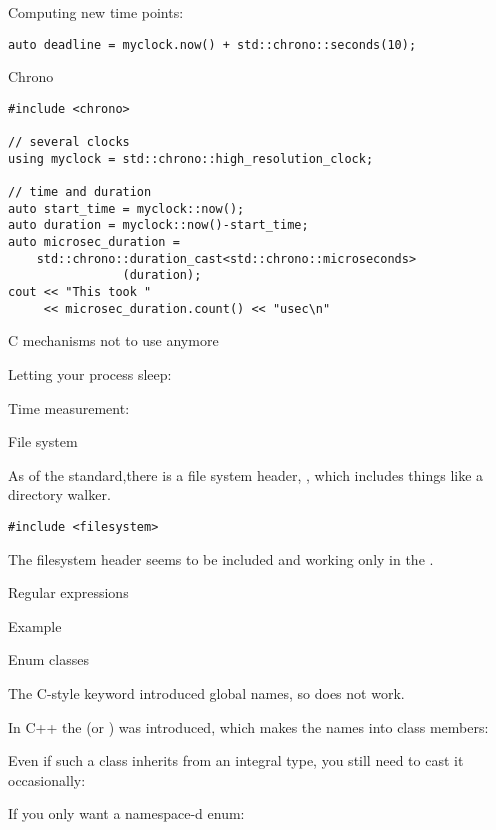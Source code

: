 Computing new time points:
\begin{lstlisting}
auto deadline = myclock.now() + std::chrono::seconds(10);
\end{lstlisting}

\begin{slide}{Chrono}
\label{sl:chrono}
\begin{lstlisting}
#include <chrono>

// several clocks
using myclock = std::chrono::high_resolution_clock;

// time and duration
auto start_time = myclock::now();
auto duration = myclock::now()-start_time;
auto microsec_duration =
    std::chrono::duration_cast<std::chrono::microseconds>
                (duration);
cout << "This took "
     << microsec_duration.count() << "usec\n"
\end{lstlisting}
\end{slide}

 {C mechanisms not to use anymore}

Letting your process sleep: 

Time measurement: 

 {File system}

As of the  standard,there is a file system header,
,
which includes things like a directory walker.
\begin{lstlisting}
#include <filesystem>
\end{lstlisting}

\begin{taccnote}
  The filesystem header seems to be included and working
  only in the .
\end{taccnote}

 {Regular expressions}

\begin{block}{Example}
  \label{sl:regex-example}
\end{block}

 {Enum classes}
\label{sec:enum-class}

The C-style  keyword introduced global names, so
does not work.

In C++ the 
(or )
was introduced, which makes the names into class members:

Even if such a class inherits from an integral type,
you still need to cast it occasionally:

If you only want a namespace-d enum:


